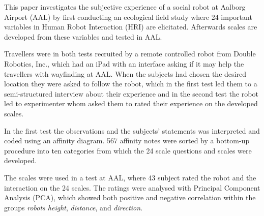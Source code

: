 \label{Abstract}
This paper investigates the subjective experience of a social robot at Aalborg Airport (AAL) by first conducting an ecological field study where 24 important variables in Human Robot Interaction (HRI) are elicitated. Afterwards scales are developed from these variables and tested in AAL. 

Travellers were in both tests recruited by a remote controlled robot from Double Robotics, Inc., which had an iPad with an interface asking if it may help the travellers with wayfinding at AAL. When the subjects had chosen the desired location they were asked to follow the robot, which in the first test led them to a semi-structured interview about their experience and in the second test the robot led to experimenter whom asked them to rated their experience on the developed scales. 

In the first test the observations and the subjects' statements was interpreted and coded using an affinity diagram. 567 affinity notes were sorted by a bottom-up procedure into ten categories from which the 24 scale questions and scales were developed. 

The scales were used in a test at AAL, where 43 subject rated the robot and the interaction on the 24 scales. The ratings were analysed with Principal Component Analysis (PCA), which showed both positive and negative correlation within the groups \textit{robots height}, \textit{distance}, and \textit{direction}. 


%
%




